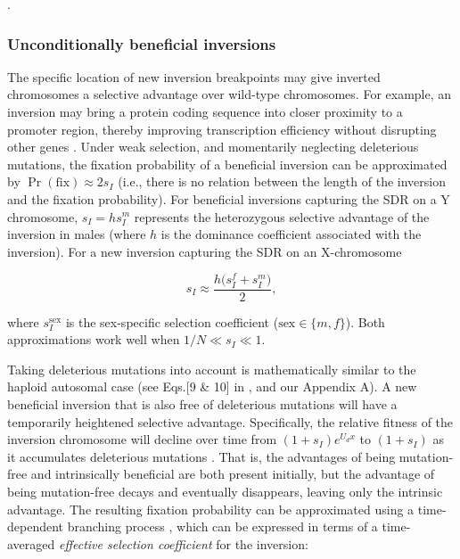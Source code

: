 \documentclass{article}
\begin{document}
.


\subsubsection*{Unconditionally beneficial inversions}

The specific location of new inversion breakpoints may give inverted chromosomes a selective advantage over wild-type chromosomes. For example, an inversion may bring a protein coding sequence into closer proximity to a promoter region, thereby improving transcription efficiency without disrupting other genes \citep{KrimbasPowell1992}. Under weak selection, and momentarily neglecting deleterious mutations, the fixation probability of a beneficial inversion can be approximated by $\Pr(\text{fix}) \approx 2 s_{I}$ \citep{Haldane1927} (i.e., there is no relation between the length of the inversion and the fixation probability). For beneficial inversions capturing the SDR on a Y chromosome, $s_I = h s_{I}^{m}$ represents the heterozygous selective advantage of the inversion in males (where $h$ is the dominance coefficient associated with the inversion). For a new inversion capturing the SDR on an X-chromosome

\begin{equation} \label{eq:benXlinkednoDel}
	s_{I} \approx \frac{h \big( s_{I}^{f} + s_{I}^{m} \big)}{2},
\end{equation}

\noindent where $s_{I}^{\text{sex}}$ is the sex-specific selection coefficient ($\text{sex} \in \{m,f\}$). Both approximations work well when $1/N \ll s_I \ll 1$.

Taking deleterious mutations into account is mathematically similar to the haploid autosomal case (see Eqs.[9 \& 10] in \citealt{ConnallonOlito2020}, and our Appendix A). A new beneficial inversion that is also free of deleterious mutations will have a temporarily heightened selective advantage. Specifically, the relative fitness of the inversion chromosome will decline over time from $(1 + s_I)e^{U_d x}$ to $(1 + s_I)$ as it accumulates deleterious mutations \citep{Nei1967}. That is, the advantages of being mutation-free and intrinsically beneficial are both present initially, but the advantage of being mutation-free decays and eventually disappears, leaving only the intrinsic advantage. The resulting fixation probability can be approximated using a time-dependent branching process \citep{PeischlKirkpatrick2012, KirkpatrickPeischl2013}, which can be expressed in terms of a time-averaged {\itshape effective selection coefficient} for the inversion:
\end{document}
